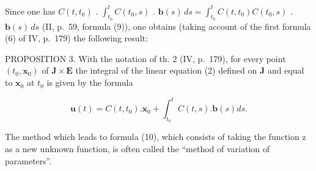 Since one has \(C(t, t_{0})\) . \(\int_{t_{0}}^{t} C(t_{0}, s)\) . \(\mathbf{b}(s) \, ds = \int_{t_{0}}^{t} C(t, t_{0}) C(t_{0}, s)\) . \(\mathbf{b}(s) \, ds\) (II, p.~59, formula (9)), one obtains (taking account of the first formula (6) of IV, p.~179) the following result:

PROPOSITION 3. With the notation of th. 2 (IV, p.~179), for every point \((t_0, \mathbf{x}_0)\) of \(\mathbf{J} \times \mathbf{E}\) the integral of the linear equation (2) defined on \(\mathbf{J}\) and equal to \(\mathbf{x}_0\) at \(t_0\) is given by the formula

\[
\mathbf {u} (t) = C (t, t _ {0}). \mathbf {x} _ {0} + \int_ {t _ {0}} ^ {t} C (t, s). \mathbf {b} (s) d s.\tag{10}
\]

The method which leads to formula (10), which consists of taking the function z as a new unknown function, is often called the ``method of variation of parameters''.
\relax{}
